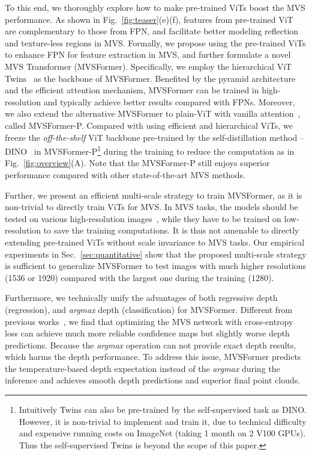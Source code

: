 \documentclass[10pt]{article} \usepackage[preprint]{tmlr}
\begin{document}
To this end, we thoroughly explore how to make pre-trained ViTs boost the MVS performance. 
As shown in Fig.~\ref{fig:teaser}(e)(f), features from pre-trained ViT are complementary to those from FPN, and facilitate better modeling reflection and texture-less regions in MVS. Formally, we propose using the pre-trained ViTs to enhance FPN for feature extraction in MVS, and further formulate a novel MVS Transformer (MVSFormer). 
Specifically, we employ the hierarchical ViT Twins~\citep{chu2021twins} as the backbone of MVSFormer. Benefited by the pyramid architecture and the efficient attention mechanism, MVSFormer can be trained in high-resolution and typically achieve better results compared with FPNs.
Moreover, we also extend the alternative MVSFormer to plain-ViT with vanilla attention~\citep{dosovitskiy2020image,caron2021emerging,he2021masked}, called MVSFormer-P. 
Compared with using efficient and hierarchical ViTs, we freeze the \textit{off-the-shelf} ViT backbone pre-trained by the self-distillation method -- DINO~\citep{caron2021emerging} in MVSFormer-P\footnote{\scriptsize{Intuitively Twins can also be pre-trained by the self-supervised task as DINO. However, it is non-trivial to implement and train it, due to technical difficulty and expensive running costs on ImageNet (taking 1 month on 2 V100 GPUs). Thus the self-supervised Twins is beyond the scope of this paper.}} during the training to reduce the computation as in Fig.~\ref{fig:overview}(A). 
Note that the MVSFormer-P still enjoys superior performance compared with other state-of-the-art MVS methods. 

Further, we present an efficient multi-scale strategy to train  MVSFormer, as it is non-trivial to directly train ViTs for MVS. In MVS tasks, the models should be tested on various high-resolution images~\citep{aanaes2016large,Knapitsch2017}, while they have to be trained on low-resolution to save the training computations. It is thus not amenable to directly extending pre-trained ViTs without scale invariance to MVS tasks. Our empirical experiments in Sec.~\ref{sec:quantitative} show that the proposed multi-scale strategy is sufficient to generalize MVSFormer to test images with much higher resolutions (1536 or 1920) compared with the largest one during the training (1280).

Furthermore, we technically unify the advantages of both regressive depth (regression), and \emph{argmax} depth (classification) for MVSFormer.
Different from previous works~\citep{wang2022itermvs,peng2022rethinking,wang2022mvster}, we find that optimizing the MVS network with cross-entropy loss can achieve much more reliable confidence maps but slightly worse depth predictions. Because the \emph{argmax} operation can not provide exact depth results, which harms the depth performance.
To address this issue, MVSFormer predicts the temperature-based depth expectation instead of the \emph{argmax} during the inference and achieves smooth depth predictions and superior final point clouds.
\end{document}
